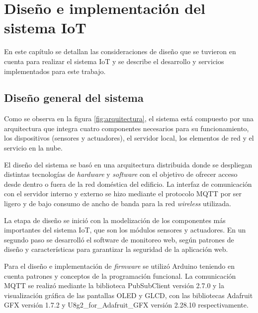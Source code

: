 \chapter{Diseño e implementación del sistema IoT} %

\label{Chapter3} %

En este capítulo se detallan las consideraciones de diseño que se tuvieron en cuenta para realizar el sistema IoT y se describe el desarrollo y servicios implementados para este trabajo.





\section{Diseño general del sistema}

Como se observa en la figura \ref{fig:arquitectura}, el sistema está compuesto por una arquitectura que integra cuatro componentes necesarios para su funcionamiento, los dispositivos (sensores y actuadores), el servidor local, los elementos de red y el servicio en la nube.

El diseño del sistema se basó en una arquitectura distribuida donde se despliegan distintas tecnologías de \emph{hardware} y \emph{software} con el objetivo de ofrecer acceso desde dentro o fuera de la red doméstica del edificio. La interfaz de comunicación con el servidor interno y externo se hizo mediante el protocolo MQTT por ser ligero y de bajo consumo de ancho de banda para la red \emph{wireless} utilizada. 

La etapa de diseño se inició con la modelización de los componentes más importantes del sistema IoT, que son los módulos sensores y actuadores. En un segundo paso se desarrolló el software de monitoreo web, según patrones de diseño y características para garantizar la seguridad de la aplicación web. 

Para el diseño e implementación de \emph{firmware} se utilizó Arduino teniendo en cuenta patrones y conceptos de la programación funcional. La comunicación MQTT se realizó mediante la biblioteca PubSubClient versión 2.7.0 \citep{WEBSITE:46} y la visualización gráfica de las pantallas OLED y GLCD, con las bibliotecas Adafruit GFX versión 1.7.2 \citep{WEBSITE:47} y U8g2\_for\_Adafruit\_GFX versión 2.28.10 \citep{WEBSITE:48} respectivamente.


